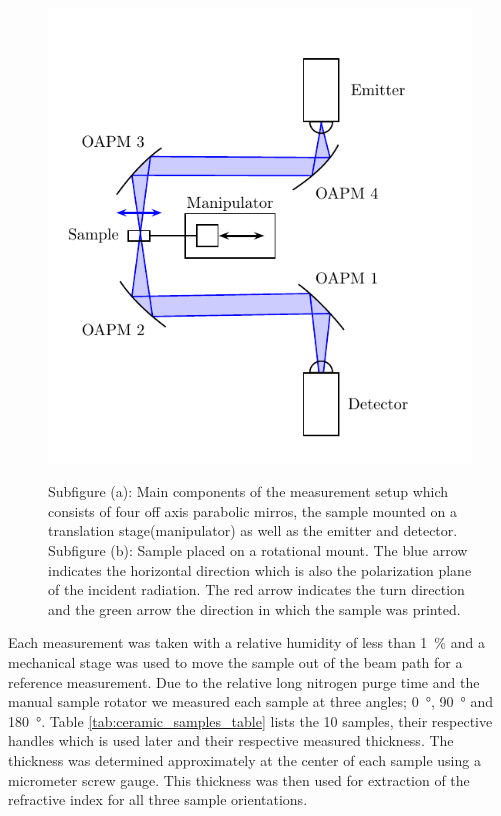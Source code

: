\begin{figure}[H]
    \centering
    \subcaptionbox{\label{fig:1}}
        {\hspace*{-2em}\includegraphics[width=0.45\linewidth]{images/7_appendix/Setup-THz-TDS-HHI.pdf}}
    \qquad
    \subcaptionbox{\label{fig:2}}
        {\hspace*{-2em}}
    
    \caption{Subfigure (a): Main components of the measurement setup which consists of four off axis parabolic mirros, the sample mounted on a translation stage(manipulator) as well as the emitter and detector. Subfigure (b): Sample placed on a rotational mount. The blue arrow indicates the horizontal direction which is also the polarization plane of the incident radiation. The red arrow indicates the turn direction and the green arrow the direction in which the sample was printed.}
    \label{fig:THz-TDS-HHI}
\end{figure}

Each measurement was taken with a relative humidity of less than \SI{1}{\percent} and a mechanical stage was used to move the sample out of the beam path for a reference measurement. Due to the relative long nitrogen purge time and the manual sample rotator we measured each sample at three angles; \SI{0}{\degree}, \SI{90}{\degree} and \SI{180}{\degree}.
Table \ref{tab:ceramic_samples_table} lists the 10 samples, their respective handles which is used later and their respective measured thickness. The thickness was determined approximately at the center of each sample using a micrometer screw gauge. This thickness was then used for extraction of the refractive index for all three sample orientations. 


